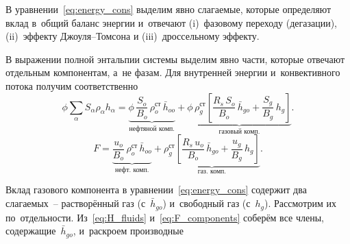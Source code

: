 \documentclass[12pt,a4paper]{article}
\begin{document}
В уравнении~\eqref{eq:energy_cons} выделим явно слагаемые, которые определяют
вклад в~общий баланс энергии и~отвечают (i)~фазовому переходу (дегазации),
(ii)~эффекту Джоуля--Томсона и (iii)~дроссельному эффекту.

В выражении полной энтальпии системы выделим явно части,
которые отвечают отдельным компонентам, а~не фазам.
Для внутренней энергии и~конвективного потока получим соответственно
\begin{equation}\label{eq:H_fluids}
  \phi\sum_\alpha S_\alpha\rho_\alpha h_\alpha
  = \underbrace{\phi\,\frac{S_o}{B_o}\,\rho_o^{\text{ст}}\,
      \bar{h}_{oo}}_{\text{нефтяной комп.}}
    + \underbrace{\phi\,\rho_g^{\text{ст}}\!\left[
        \frac{R_s\,S_o}{B_o}\,\bar{h}_{go}
        + \frac{S_g}{B_g}\,h_g
      \right]}_{\text{газовый комп.}}.
\end{equation}
\begin{equation}\label{eq:F_components}
  F = \underbrace{\frac{u_o}{B_o}\,\rho_o^{\text{ст}}\,
        \bar{h}_{oo}}_{\text{нефт.\ комп.}}
      + \underbrace{\rho_g^{\text{ст}}\!\left[
          \frac{R_s\,u_o}{B_o}\,\bar{h}_{go}
          + \frac{u_g}{B_g}\,h_g
        \right]}_{\text{газ.\ комп.}}.
\end{equation}

Вклад газового компонента в уравнении~\eqref{eq:energy_cons} содержит
два слагаемых~-- растворённый газ (с~$\bar{h}_{go}$) и~свободный газ
(с~$h_g$). Рассмотрим их по~отдельности. Из~\eqref{eq:H_fluids} и~\eqref{eq:F_components}
соберём все члены, содержащие~$\bar{h}_{go}$, и~раскроем производные
\end{document}
